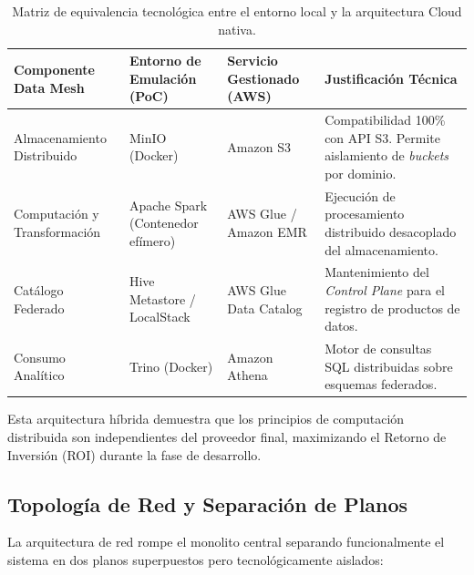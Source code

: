 \documentclass[12pt, a4paper]{article}
\begin{document}
\begin{table}[h]
    \centering
    \renewcommand{\arraystretch}{1.3}
    \begin{tabular}{>{\raggedright\arraybackslash}p{3cm} >{\raggedright\arraybackslash}p{3.5cm} >{\raggedright\arraybackslash}p{3.5cm} >{\raggedright\arraybackslash}p{4cm}}
        \toprule
        \textbf{Componente Data Mesh} & \textbf{Entorno de Emulación (PoC)} & \textbf{Servicio Gestionado (AWS)} & \textbf{Justificación Técnica} \\
        \midrule
        Almacenamiento Distribuido & MinIO (Docker) & Amazon S3 & Compatibilidad 100\% con API S3. Permite aislamiento de \textit{buckets} por dominio. \\
        Computación y Transformación & Apache Spark (Contenedor efímero) & AWS Glue / Amazon EMR & Ejecución de procesamiento distribuido desacoplado del almacenamiento. \\
        Catálogo Federado & Hive Metastore / LocalStack & AWS Glue Data Catalog & Mantenimiento del \textit{Control Plane} para el registro de productos de datos. \\
        Consumo Analítico & Trino (Docker) & Amazon Athena & Motor de consultas SQL distribuidas sobre esquemas federados. \\
        \bottomrule
    \end{tabular}
    \caption{Matriz de equivalencia tecnológica entre el entorno local y la arquitectura Cloud nativa.}
    \label{tab:equivalencia}
\end{table}

Esta arquitectura híbrida demuestra que los principios de computación distribuida son independientes del proveedor final, maximizando el Retorno de Inversión (ROI) durante la fase de desarrollo.

\subsection{Topología de Red y Separación de Planos}

La arquitectura de red rompe el monolito central separando funcionalmente el sistema en dos planos superpuestos pero tecnológicamente aislados:
\end{document}
